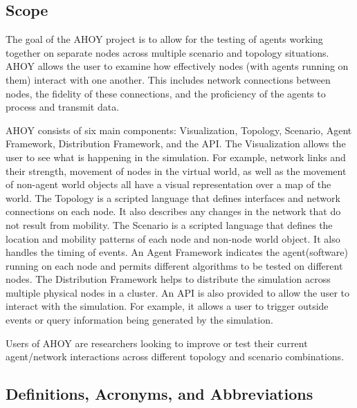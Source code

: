 \documentclass[titlepage]{article}
\begin{document}

\subsection{Scope%
  \label{scope}%
}

The goal of the AHOY project is to allow for the testing of agents working together on separate nodes across multiple scenario and topology situations.  AHOY allows the user to examine how effectively nodes (with agents running on them) interact with one another.  This includes network connections between nodes, the fidelity of these connections, and the proficiency of the agents to process and transmit data.

AHOY consists of six main components: Visualization, Topology, Scenario, Agent Framework, Distribution Framework, and the API.  The Visualization allows the user to see what is happening in the simulation.  For example, network links and their strength, movement of nodes in the virtual world, as well as the movement of non-agent world objects all have a visual representation over a map of the world.  The Topology is a scripted language that defines interfaces and network connections on each node.  It also describes any changes in the network that do not result from mobility.  The Scenario is a scripted language that defines the location and mobility patterns of each node and non-node world object. It also handles the timing of events. An Agent Framework indicates the agent(software) running on each node and permits different algorithms to be tested on different nodes.  The Distribution Framework helps to distribute the simulation across multiple physical nodes in a cluster.  An API is also provided to allow the user to interact with the simulation.  For example, it allows a user to trigger outside events or query information being generated by the simulation. 

Users of AHOY are researchers looking to improve or test their current agent/network interactions across different topology and scenario combinations.  

\subsection{Definitions, Acronyms, and Abbreviations%
  \label{definitions}%
}
\end{document}
